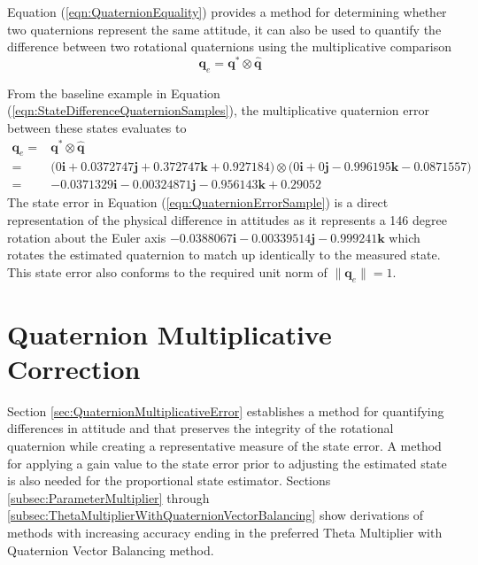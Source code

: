 \documentclass[]{aiaa-tc}%
\newcommand{\bs}[1]{\boldsymbol{#1}}
\begin{document}
Equation (\ref{eqn:QuaternionEquality}) provides a method for determining whether two quaternions represent the same attitude, it can also be used to quantify the difference between two rotational quaternions using the multiplicative comparison
\begin{equation}
  \bs{q}_e = \bs{q}^* \otimes \bs{\hat{q}}
  \label{eqn:QuaternionError}
\end{equation}

From the baseline example in Equation (\ref{eqn:StateDifferenceQuaternionSamples}), the multiplicative quaternion error between these states evaluates to
\begin{equation}
  \begin{aligned}
    \bs{q}_e = & \bs{q}^* \otimes \bs{\hat{q}} \\
    = & \big( 0 \bs{i} +0.0372747 \bs{j} +0.372747 \bs{k} +0.927184 \big)  \otimes \big( 0 \bs{i} +0 \bs{j} -0.996195 \bs{k} -0.0871557 \big)\\
    = & -0.0371329 \bs{i} -0.00324871 \bs{j} -0.956143 \bs{k} +0.29052
  \end{aligned}
  \label{eqn:QuaternionErrorSample}
\end{equation}
The state error in Equation (\ref{eqn:QuaternionErrorSample}) is a direct representation of the physical difference in attitudes as it represents a 146 degree rotation about the Euler axis $-0.0388067 \bs{i} -0.00339514 \bs{j} -0.999241\bs{k}$ which rotates the estimated quaternion to match up identically to the measured state.  This state error also conforms to the required unit norm of $\| \bs{q}_e  \| = 1 $.

\section{Quaternion Multiplicative Correction}
\label{sec:QuaternionMultiplicativeCorrection}

Section \ref{sec:QuaternionMultiplicativeError} establishes a method for quantifying differences in attitude and that preserves the integrity of the rotational quaternion while creating a representative measure of the state error.  A method for applying a gain value to the state error prior to adjusting the estimated state is also needed for the proportional state estimator.  Sections \ref{subsec:ParameterMultiplier} through \ref{subsec:ThetaMultiplierWithQuaternionVectorBalancing} show derivations of methods with increasing accuracy ending in the preferred Theta Multiplier with Quaternion Vector Balancing method.
\end{document}

